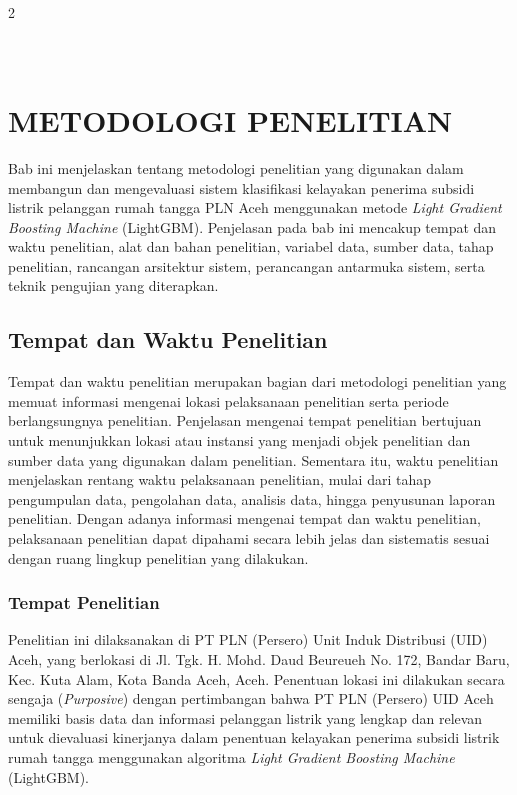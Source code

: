 \documentclass[12pt, a4paper, onecolumn, oneside]{report}
\begin{document}
\begin{spacing}{2}
\chapter[METODOLOGI PENELITIAN]{\\ METODOLOGI PENELITIAN}

Bab ini menjelaskan tentang metodologi penelitian yang digunakan dalam membangun dan mengevaluasi sistem klasifikasi kelayakan penerima subsidi listrik pelanggan rumah tangga PLN Aceh menggunakan metode \textit{Light Gradient Boosting Machine} (LightGBM). Penjelasan pada bab ini mencakup tempat dan waktu penelitian, alat dan bahan penelitian, variabel data, sumber data, tahap penelitian, rancangan arsitektur sistem, perancangan antarmuka sistem, serta teknik pengujian yang diterapkan.

\section{Tempat dan Waktu Penelitian}
Tempat dan waktu penelitian merupakan bagian dari metodologi penelitian yang memuat informasi mengenai lokasi pelaksanaan penelitian serta periode berlangsungnya penelitian. Penjelasan mengenai tempat penelitian bertujuan untuk menunjukkan lokasi atau instansi yang menjadi objek penelitian dan sumber data yang digunakan dalam penelitian. Sementara itu, waktu penelitian menjelaskan rentang waktu pelaksanaan penelitian, mulai dari tahap pengumpulan data, pengolahan data, analisis data, hingga penyusunan laporan penelitian. Dengan adanya informasi mengenai tempat dan waktu penelitian, pelaksanaan penelitian dapat dipahami secara lebih jelas dan sistematis sesuai dengan ruang lingkup penelitian yang dilakukan.

\subsection{Tempat Penelitian}
Penelitian ini dilaksanakan di PT PLN (Persero) Unit Induk Distribusi (UID) Aceh, yang berlokasi di Jl. Tgk. H. Mohd. Daud Beureueh No. 172, Bandar Baru, Kec. Kuta Alam, Kota Banda Aceh, Aceh. Penentuan lokasi ini dilakukan secara sengaja (\textit{Purposive}) dengan pertimbangan bahwa PT PLN (Persero) UID Aceh memiliki basis data dan informasi pelanggan listrik yang lengkap dan relevan untuk dievaluasi kinerjanya dalam penentuan kelayakan penerima subsidi listrik rumah tangga menggunakan algoritma \textit{Light Gradient Boosting Machine} (LightGBM).


\end{spacing}
\end{document}
